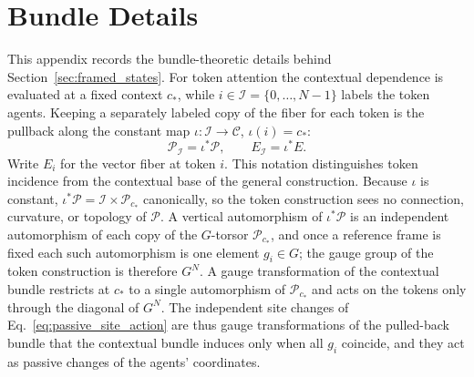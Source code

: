 \documentclass[twoside,11pt]{article}
\begin{document}

\appendix


\section{Bundle Details}
\label{app:bundle_details}

This appendix records the bundle-theoretic details behind Section~\ref{sec:framed_states}. For token attention the contextual dependence is evaluated at a fixed context \(c_*\), while \(i\in\mathcal I=\{0,\ldots,N-1\}\) labels the token agents. Keeping a separately labeled copy of the fiber for each token is the pullback along the constant map \(\iota:\mathcal I\to\mathcal C\), \(\iota(i)=c_*\):
\begin{equation}
\mathcal P_{\mathcal I}=\iota^*\mathcal P,
\qquad E_{\mathcal I}=\iota^*E.
\label{eq:token_bundle_pullback}
\end{equation}
Write \(E_i\) for the vector fiber at token \(i\). This notation distinguishes token incidence from the contextual base of the general construction. Because \(\iota\) is constant, \(\iota^*\mathcal P=\mathcal I\times\mathcal P_{c_*}\) canonically, so the token construction sees no connection, curvature, or topology of \(\mathcal P\). A vertical automorphism of \(\iota^*\mathcal P\) is an independent automorphism of each copy of the \(G\)-torsor \(\mathcal P_{c_*}\), and once a reference frame is fixed each such automorphism is one element \(g_i\in G\); the gauge group of the token construction is therefore \(G^N\). A gauge transformation of the contextual bundle restricts at \(c_*\) to a single automorphism of \(\mathcal P_{c_*}\) and acts on the tokens only through the diagonal of \(G^N\). The independent site changes of Eq.~\eqref{eq:passive_site_action} are thus gauge transformations of the pulled-back bundle that the contextual bundle induces only when all \(g_i\) coincide, and they act as passive changes of the agents' coordinates.
\end{document}
